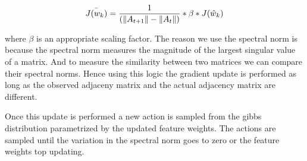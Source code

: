 \[
\bar{J(w_k)} = \frac{1}{(\|A_{t+1}\| - \|A_t\|)}*\beta*J(\hat{w}_k)\\
\]

where $\beta$ is an appropriate scaling factor. The reason we use the spectral norm is because the spectral norm measures the magnitude of the largest singular value of a matrix. And to measure the similarity between two matrices we can compare their spectral norms. Hence using this logic the gradient update is performed as long as the observed adjaceny matrix and the actual adjacency matrix are different.

Once this update is performed a new action is sampled from the gibbs distribution parametrized by the updated feature weights. The actions are sampled until the variation in the spectral norm goes to zero or the feature weights top updating.

